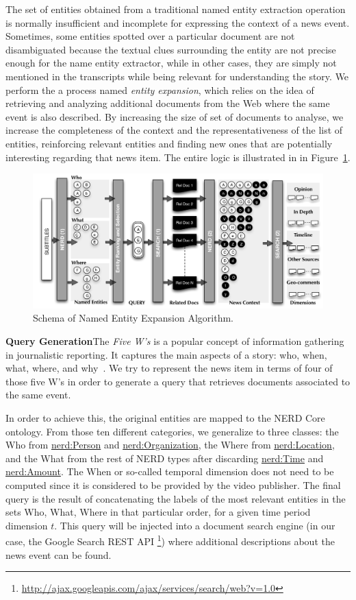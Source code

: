 \documentclass{llncs}
\begin{document}
The set of entities obtained from a traditional named entity extraction operation is normally insufficient and incomplete for expressing the context of a news event. Sometimes, some entities spotted over a particular document are not disambiguated because the textual clues surrounding the entity are not precise enough for the name entity extractor, while in other cases, they are simply not mentioned in the transcripts while being relevant for understanding the story. We perform the a process named \emph{entity expansion}, which relies on the idea of retrieving and analyzing additional documents from the Web where the same event is also described. By increasing the size of set of documents to analyse, we increase the completeness of the context and the representativeness of the list of entities, reinforcing relevant entities and finding new ones that are potentially interesting regarding that news item. The entire logic is illustrated in in Figure~\ref{fig:namedEntityExpansion}.

\begin{figure}[t!]
\centering
\includegraphics[width=1\textwidth]{figure/ExpansionDiagram}
\caption{Schema of Named Entity Expansion Algorithm.}
\label{fig:namedEntityExpansion}%
\end{figure}

\textbf{Query Generation}The \emph{Five W's} is a popular concept of information gathering in journalistic reporting. It captures the main aspects of a story: who, when, what, where, and why~\cite{LiJia2007}. We try to represent the news item in terms of four of those five W's in order to generate a query that retrieves documents associated to the same event.

In order to achieve this, the original entities are mapped to the NERD Core ontology. From those ten different categories, we generalize to three classes: the Who from \url{nerd:Person} and \url{nerd:Organization}, the Where from \url{nerd:Location}, and the What from the rest of NERD types after discarding \url{nerd:Time} and \url{nerd:Amount}. The When or so-called temporal dimension does not need to be computed since it is considered to be provided by the video publisher. The final query is the result of concatenating the labels of the most relevant entities in the sets Who, What, Where in that particular order, for a given time period dimension $t$.  
This query will be injected into a document search engine (in our case, the Google Search REST API \footnote{\fontsize{8pt}{1em}\selectfont  \url{http://ajax.googleapis.com/ajax/services/search/web?v=1.0}}) where additional descriptions about the news event can be found.
\end{document}
